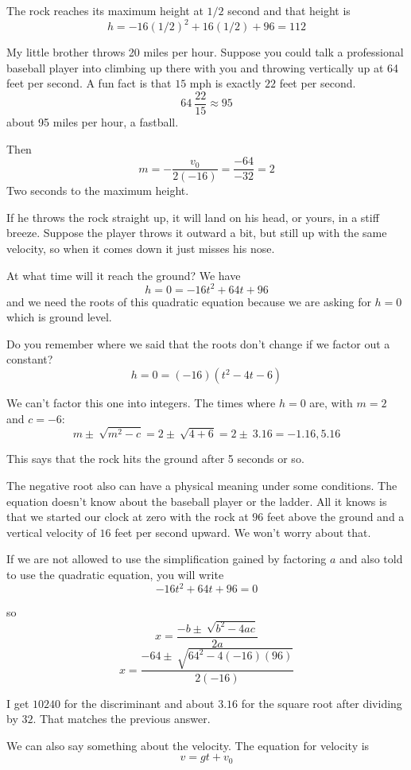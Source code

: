 \documentclass[11pt, oneside]{article}
\begin{document}
The rock reaches its maximum height at $1/2$ second and that height is
\[ h = -16(1/2)^2 + 16(1/2) + 96 = 112 \]

My little brother throws 20 miles per hour.  Suppose you could talk a professional baseball player into climbing up there with you and throwing vertically up at 64 feet per second.  A fun fact is that $15$ mph is exactly $22$ feet per second.
\[ 64 \ \frac{22}{15} \approx 95 \]
about 95 miles per hour, a fastball.

Then
\[ m = - \frac{v_0}{2(-16)} = \frac{-64}{-32} = 2 \]
Two seconds to the maximum height.

If he throws the rock straight up, it will land on his head, or yours, in a stiff breeze.  Suppose the player throws it outward a bit, but still up with the same velocity, so when it comes down it just misses his nose.  

At what time will it reach the ground?  We have
\[ h = 0 = -16t^2 + 64t + 96 \]
and we need the roots of this quadratic equation because we are asking for $h = 0$ which is ground level.

Do you remember where we said that the roots don't change if we factor out a constant?
\[ h = 0 = (-16)(t^2 - 4t - 6) \]

We can't factor this one into integers.  The times where $h = 0$ are, with $m = 2$ and $c = -6$:
\[ m \pm \ \sqrt{m^2 - c} = 2 \pm \ \sqrt{4 + 6} = 2 \pm \ 3.16 = - 1.16, 5.16 \]

This says that the rock hits the ground after 5 seconds or so.  

The negative root also can have a physical meaning under some conditions.  The equation doesn't know about the baseball player or the ladder.  All it knows is that we started our clock at zero with the rock at $96$ feet above the ground and a vertical velocity of $16$ feet per second upward.  We won't worry about that.

If we are not allowed to use the simplification gained by factoring $a$ and also told to use the quadratic equation, you will write
\[ -16t^2 + 64t + 96 = 0 \]

so
\[ x = \frac{-b \pm \ \sqrt{b^2 - 4ac}}{2a} \]
\[ x = \frac{-64 \pm \ \sqrt{64^2 -4(-16)(96)}}{2(-16)} \]

I get $10240$ for the discriminant and about $3.16$ for the square root after dividing by $32$.  That matches the previous answer.

We can also say something about the velocity.  The equation for velocity is
\[ v = gt + v_0 \]
\end{document}
